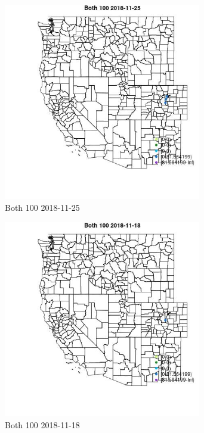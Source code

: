 \begin{figure} 
\centering  
\includegraphics[width=0.77\textwidth]{Code_Outputs/Report_ML_input_PM25_Step4_part_e_de_duplicated_aveswNAs_MapObsBoth_1002018-11-25.jpg} 
\caption{\label{fig:Report_ML_input_PM25_Step4_part_e_de_duplicated_aveswNAsMapObsBoth_1002018-11-25}Both 100 2018-11-25} 
\end{figure} 
 

\begin{figure} 
\centering  
\includegraphics[width=0.77\textwidth]{Code_Outputs/Report_ML_input_PM25_Step4_part_e_de_duplicated_aveswNAs_MapObsBoth_1002018-11-18.jpg} 
\caption{\label{fig:Report_ML_input_PM25_Step4_part_e_de_duplicated_aveswNAsMapObsBoth_1002018-11-18}Both 100 2018-11-18} 
\end{figure} 
 

